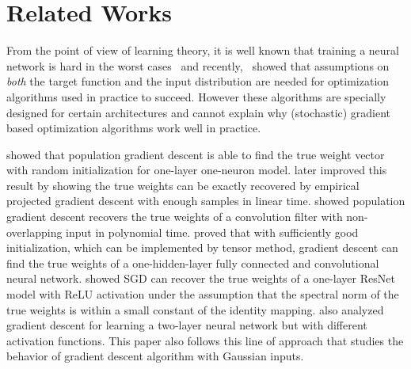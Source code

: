 \documentclass{article}
\begin{document}
\section{Related Works}\label{sec:rel}%
From the point of view of learning theory, it is well known that training a neural network is hard in the worst cases~\citep{blum1989training,livni2014computational,vsima2002training,shalev2017failures,shalev2017weight} and recently,~\citet{shamir2016distribution} showed that assumptions on \emph{both} the target function and the input distribution are needed for optimization algorithms used in practice to succeed.
However these algorithms are specially designed for certain architectures and cannot explain why (stochastic) gradient based optimization algorithms work well in practice.

\citet{tian2017analytical} showed that population gradient descent is able to find the true weight vector with random initialization for one-layer one-neuron model.
\citet{soltanolkotabi2017learning} later improved this result by showing the true weights can be exactly recovered by empirical projected gradient descent with enough samples in linear time.
\citet{brutzkus2017globally} showed population gradient descent recovers the true weights of a convolution filter with non-overlapping input in polynomial time.
\citet{zhong2017recovery,zhong2017learning} proved that with sufficiently good initialization, which can be implemented by tensor method, gradient descent can find the true weights of a one-hidden-layer fully connected and convolutional neural network. 
\citet{li2017convergence} showed SGD can recover the true weights of a one-layer ResNet model with ReLU activation under the assumption that the spectral norm of the true weights is within a small constant of the identity mapping.
\cite{panigrahy2018convergence} also analyzed gradient descent for learning a two-layer neural network but with different activation functions.
This paper also follows this line of approach that studies the behavior of gradient descent algorithm with Gaussian inputs.
\end{document}
